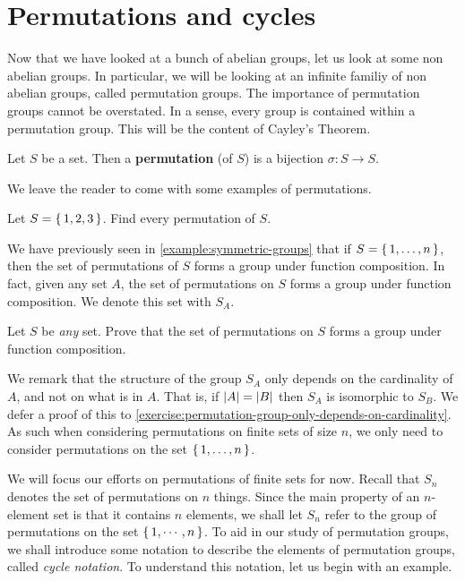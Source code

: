 \documentclass[./main.tex]{subfiles}
\begin{document}
\section{Permutations and cycles}
Now that we have looked at a bunch of abelian groups, let us look at some non
abelian groups. In particular, we will be looking at an infinite familiy of non
abelian groups, called permutation groups. The importance of permutation groups
cannot be overstated. In a sense, every group is contained within a permutation
group. This will be the content of Cayley's Theorem. 

\begin{definition}[Permutation]
\label{def:permutation}
    Let $S$ be a set. Then a \textbf{permutation} (of $S$) is a bijection
    $\sigma: S \to S$.
\end{definition}
We leave the reader to come with some examples of permutations. 
\begin{exercise}
    Let $S = \set{1,2,3}$. Find every permutation of $S$.
\end{exercise}

We have previously seen in \cref{example:symmetric-groups} that if $S =
\set{1,\dots,n}$, then the set of permutations of $S$ forms a group under
function composition. In fact, given any set $A$, the set of permutations on $S$
forms a group under function composition. We denote this set with
$S_A$.
\begin{exercise}
    Let $S$ be \emph{any} set. Prove that the set of permutations on $S$ forms a
    group under function composition.
\end{exercise}
We remark that the structure of the group $S_A$ only depends on the cardinality
of $A$, and not on what is in $A$. That is, if $\abs{A} = \abs{B}$ then $S_A$ is
isomorphic to $S_B$. We defer a proof of this to
\cref{exercise:permutation-group-only-depends-on-cardinality}. As such when
considering permutations on finite sets of size $n$, we only need to consider
permutations on the set $\set{1, \dots, n}$.

We will focus our efforts on permutations of finite sets for now. Recall that
$S_n$ denotes the set of permutations on $n$ things. Since the main property of
an $n$-element set is that it contains $n$ elements, we shall let $S_n$ refer to
the group of permutations on the set $\set{1, \cdots, n}$. To aid in our study
of permutation groups, we shall introduce some notation to describe the elements
of permutation groups, called \emph{cycle notation}. To understand this
notation, let us begin with an example.
\end{document}

